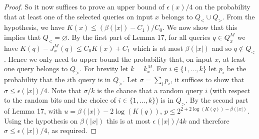 \begin{proof}
So it now suffices to prove an upper bound of $\epsilon(x)/4$ on the probability that at least one of the selected queries on input $x$ belongs to $Q_<\cup Q_>$.
From the hypothesis, we have $K(x)\leq(\beta(|x|)-C_1)/C_0$. We now show that this implies that $Q_<=\varnothing$. By the first part of Lemma 17, for all queries $q\in Q_x^M$ we have $K(q)-J_x^M(q)\leq C_0K(x)+C_1$ which is at most $\beta(|x|)$ and so $q\notin Q_<$.
Hence we only need to upper bound the probability that, on input $x$, at least one query belongs to $Q_>$. For brevity let $k=k_x^M$. For $i\in\{1,\ldots,k\}$ let $p_i$ be the probability that the $i$th query is in $Q_>$. Let $\sigma=\sum_ip_i$, it suffices to show that $\sigma\leq\epsilon(|x|)/4$. Note that $\sigma/k$ is the chance that a random query $i$ (with respect to the random bits and the choice of $i\in\{1,\ldots,k\}$) is in $Q_>$. By the second part of Lemma 17, with $u=\beta(|x|)-2\log(K(q))$, $p\leq2^{2+2\log(K(q))-\beta(|x|)}$. Using the hypothesis on $\beta(|x|)$ this is at most $\epsilon(|x|)/4k$ and therefore $\sigma\leq\epsilon(|x|)/4$, as required.
\end{proof}
